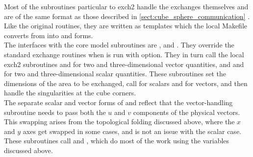 Most of the subroutines particular to exch2 handle the exchanges
themselves and are of the same format as those described in
\ref{sect:cube_sphere_communication} .  Like the original routines, they are written as
templates which the local Makefile converts from  into 
 and  forms. \\

The interfaces with the core model subroutines are
,  and
.  They override the standard exchange routines
when  is run with  option.  They in turn
call the local exch2 subroutines  and
 for two and three-dimensional vector
quantities, and  and  for two
and three-dimensional scalar quantities.  These subroutines set the
dimensions of the area to be exchanged, call 
for scalars and  for vectors, and then handle
the singularities at the cube corners. \\

The separate scalar and vector forms of  and
 reflect that the vector-handling subroutine
needs to pass both the $u$ and $v$ components of the physical vectors.
This swapping arises from the topological folding discussed above, where the
$x$ and $y$ axes get swapped in some cases, and is not an
issue with the scalar case. These subroutines call
 and , which do most of
the work using the variables discussed above. \\

